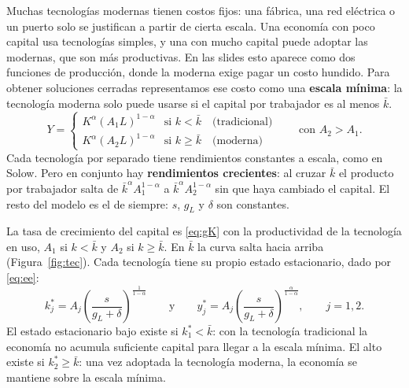 \documentclass[12pt,letterpaper]{article}
\begin{document}
Muchas tecnologías modernas tienen costos fijos: una fábrica, una red eléctrica o un puerto solo se justifican a partir de cierta escala. Una economía con poco capital usa tecnologías simples, y una con mucho capital puede adoptar las modernas, que son más productivas. En las slides esto aparece como dos funciones de producción, donde la moderna exige pagar un costo hundido. Para obtener soluciones cerradas representamos ese costo como una \textbf{escala mínima}: la tecnología moderna solo puede usarse si el capital por trabajador es al menos $\bar k$.
\[
  Y=\begin{cases}
    K^{\alpha}(A_1L)^{1-\alpha} & \text{si } k<\bar k\quad\text{(tradicional)}\\[2pt]
    K^{\alpha}(A_2L)^{1-\alpha} & \text{si } k\geq\bar k\quad\text{(moderna)}
  \end{cases}
  \qquad\text{con } A_2>A_1 .
\]
Cada tecnología por separado tiene rendimientos constantes a escala, como en Solow. Pero en conjunto hay \textbf{rendimientos crecientes}: al cruzar $\bar k$ el producto por trabajador salta de $\bar k^{\alpha}A_1^{1-\alpha}$ a $\bar k^{\alpha}A_2^{1-\alpha}$ sin que haya cambiado el capital. El resto del modelo es el de siempre: $s$, $g_L$ y $\delta$ son constantes.

La tasa de crecimiento del capital es \eqref{eq:gK} con la productividad de la tecnología en uso, $A_1$ si $k<\bar k$ y $A_2$ si $k\geq\bar k$. En $\bar k$ la curva salta hacia arriba (Figura~\ref{fig:tec}). Cada tecnología tiene su propio estado estacionario, dado por \eqref{eq:ee}:
\begin{equation}\label{eq:eej}
  k_j^*=A_j\left(\frac{s}{g_L+\delta}\right)^{\frac{1}{1-\alpha}}
  \qquad\text{y}\qquad
  y_j^*=A_j\left(\frac{s}{g_L+\delta}\right)^{\frac{\alpha}{1-\alpha}},
  \qquad j=1,2 .
\end{equation}
El estado estacionario bajo existe si $k_1^*<\bar k$: con la tecnología tradicional la economía no acumula suficiente capital para llegar a la escala mínima. El alto existe si $k_2^*\geq\bar k$: una vez adoptada la tecnología moderna, la economía se mantiene sobre la escala mínima.
\end{document}
